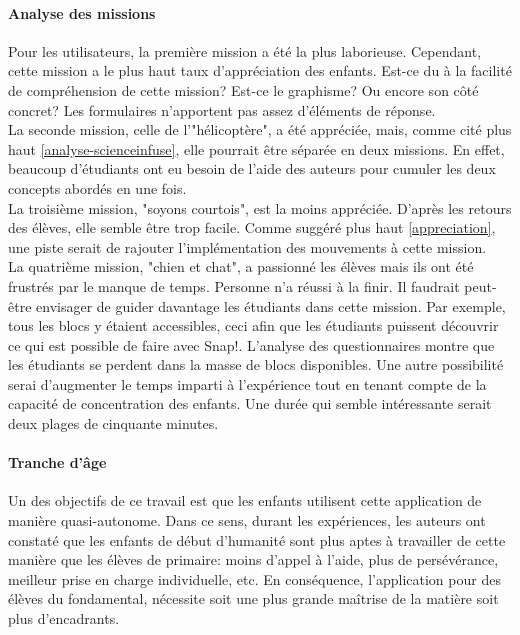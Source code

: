 \paragraph{Analyse des missions}
Pour les utilisateurs, la première mission a été la plus laborieuse. Cependant, cette mission a le plus haut taux d'appréciation des enfants. Est-ce du à la facilité de compréhension de cette mission? Est-ce le graphisme? Ou encore son côté concret? Les formulaires n'apportent pas assez d'éléments de réponse.\\

La seconde mission, celle de l'"hélicoptère", a été appréciée, mais, comme cité plus haut \ref{analyse-scienceinfuse}, elle pourrait être séparée en deux missions. En effet, beaucoup d'étudiants ont eu besoin de l'aide des auteurs pour cumuler les deux concepts abordés en une fois.\\

La troisième mission, "soyons courtois", est la moins appréciée. D'après les retours des élèves, elle semble être trop facile. Comme suggéré plus haut \ref{appreciation}, une piste serait de rajouter l'implémentation des mouvements à cette mission.\\

La quatrième mission, "chien et chat", a passionné les élèves mais ils ont été frustrés par le manque de temps. Personne n'a réussi à la finir. Il faudrait peut-être envisager de guider davantage les étudiants dans cette mission. Par exemple, tous les blocs y étaient accessibles, ceci afin que les étudiants puissent découvrir ce qui est possible de faire avec Snap!. L'analyse des questionnaires montre que les étudiants se perdent dans la masse de blocs disponibles.
Une autre possibilité serai d'augmenter le temps imparti à l'expérience tout en tenant compte de la capacité de concentration des enfants. Une durée qui semble intéressante serait deux plages de cinquante minutes.

\paragraph{Tranche d'âge}
\label{trancheage}
Un des objectifs de ce travail est que les enfants utilisent cette application de manière quasi-autonome. Dans ce sens, durant les expériences, les auteurs ont constaté que les enfants de début d'humanité sont plus aptes à travailler de cette manière que les élèves de primaire: moins d'appel à l'aide, plus de persévérance, meilleur prise en charge individuelle, etc.
En conséquence, l'application pour des élèves du fondamental, nécessite soit une plus grande maîtrise de la matière soit plus d'encadrants.







